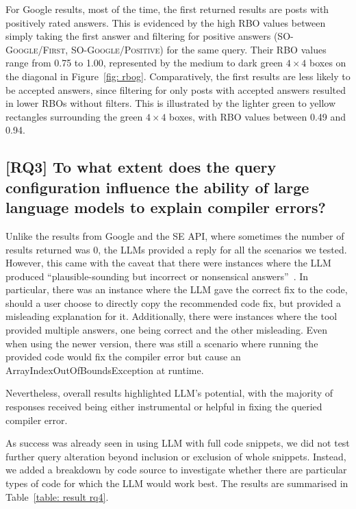 \documentclass[preprint,12pt]{elsarticle}
\begin{document}
For Google results, most of the time, the first returned results are posts with positively rated answers. This is evidenced by the high RBO values between simply taking the first answer and filtering for positive answers (\textsc{SO-Google/First}, \textsc{SO-Google/Positive}) for the same query. Their RBO values range from 0.75 to 1.00, represented by the medium to dark green $4\times4$ boxes on the diagonal in Figure~\ref{fig: rbog}. Comparatively, the first results are less likely to be accepted answers, since filtering for only posts with accepted answers resulted in lower RBOs without filters. This is illustrated by the lighter green to yellow rectangles surrounding the green $4\times4$ boxes, with RBO values between 0.49 and 0.94.

\subsection*{\textbf{[RQ3]} To what extent does the query configuration influence the ability of large language models to explain compiler errors?}

Unlike the results from Google and the SE API, where sometimes the number of results returned was 0, the LLMs provided a reply for all the scenarios we tested. However, this came with the caveat that there were instances where the LLM produced ``plausible-sounding but incorrect or nonsensical answers''~\cite{openai}. In particular, there was an instance where the LLM gave the correct fix to the code, should a user choose to directly copy the recommended code fix, but provided a misleading explanation for it. Additionally, there were instances where the tool provided multiple answers, one being correct and the other misleading. Even when using the newer version, there was still a scenario where running the provided code would fix the compiler error but cause an ArrayIndexOutOfBoundsException at runtime.

Nevertheless, overall results highlighted LLM's potential, with the majority of responses received being either instrumental or helpful in fixing the queried compiler error.

As success was already seen in using LLM with full code snippets, we did not test further query alteration beyond inclusion or exclusion of whole snippets. Instead, we added a breakdown by code source to investigate whether there are particular types of code for which the LLM would work best. The results are summarised in Table~\ref{table: result rq4}.
\end{document}

